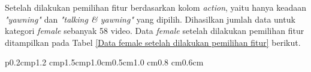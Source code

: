        Setelah dilakukan pemilihan fitur berdasarkan kolom 
        \textit{action}, yaitu hanya keadaan \textit{"yawning"} dan
         \textit{"talking \& yawning"} yang dipilih. Dihasilkan 
         jumlah data untuk kategori \textit{female} sebanyak 58 video. 
         Data \textit{female} setelah dilakukan pemilihan fitur 
         ditampilkan pada Tabel \ref{Data female setelah dilakukan pemilihan fitur} berikut.

        \begin{table}[H]
\centering
\caption{Data \textit{Female} Setelah Dilakukan Pemilihan Fitur}
\label{Data female setelah dilakukan pemilihan fitur}
\scriptsize

    \begin{tabular}{p{0.2cm}p{1.2 cm}p{1.5cm}p{1.0cm}{0.5cm}{1.0 cm}{0.8 cm}{0.6cm}}
    

\end{tabular}
\end{table}

